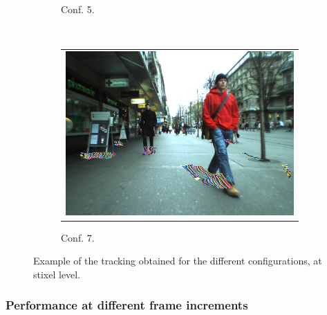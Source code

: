 \begin{figure}[h!]
\begin{subfigure}[b]{0.33\textwidth}
\begin{tabular}{c}
	  \end{tabular}
	  \caption{Conf. 5.}\label{fig:cp04_tracking_example_conf_5}
        \end{subfigure}%
        ~
        \begin{subfigure}[b]{0.33\textwidth}
	  \begin{tabular}{c}
	    \includegraphics[width=\textwidth]{trackingConf7}
	  \end{tabular}
	  \caption{Conf. 7.}\label{fig:cp04_tracking_example_conf_7}
        \end{subfigure}%
        \caption{Example of the tracking obtained for the different configurations, at stixel level.}\label{fig:cp04_tracking_examples}
\end{figure}

\subsubsection{Performance at different frame increments}\label{ch:chapter04_02_03_02}


